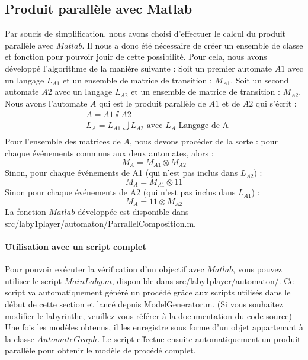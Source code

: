 \subsection{Produit parallèle avec Matlab}
\label{subsec:parallele}
Par soucis de simplification, nous avons choisi d'effectuer le calcul du produit parallèle avec $Matlab$. Il nous a donc été nécessaire de créer un ensemble de classe et fonction pour pouvoir jouir de cette possibilité. Pour cela, nous avons développé l'algorithme de la manière suivante :
Soit un premier automate $ A1$  avec un langage $L_{A1}$  et un ensemble de matrice de transition : $M_{A1}$.
Soit un second automate $A2$  avec un langage $L_{A2}$  et un ensemble de matrice de transition : $M_{A2}$.\\
Nous avons l'automate $A$ qui est le produit parallèle de $A1$ et de $A2$  qui s'écrit :
\begin{align*}
& A = A1 \sslash A2\\
&L_A = L_{A1} \bigcup L_{A2} \text{ avec } L_A\text{ Langage de A}\\
\end{align*}
Pour l'ensemble des matrices de $A$, nous devons procéder de la sorte : pour chaque événements communs aux deux automates, alors :
\begin{equation}
M_{A} = M_{A1} \otimes M_{A2}
\end{equation}
Sinon, pour chaque événements de A1 (qui n'est pas inclus dans $L_{A2}$) :
\begin{equation}
M_{A} = M_{A1} \otimes 1\!\!1 
\end{equation}
Sinon pour chaque événements de A2 (qui n'est pas inclus dans $L_{A1}$) :
\begin{equation}
M_{A} = 1\!\!1 \otimes M_{A2}
\end{equation}
La fonction $Matlab$ développée est disponible dans src/laby1player/automaton/ParrallelComposition.m. 


\paragraph*{Utilisation avec un script complet}
Pour pouvoir exécuter la vérification d'un objectif avec $Matlab$, vous pouvez utiliser le script $MainLaby.m$, disponible dans src/laby1player/automaton/. Ce script va automatiquement généré un procédé grâce aux scripts utilisés dans le début de cette section et lancé depuis ModelGenerator.m. (Si vous souhaitez modifier le labyrinthe, veuillez-vous référer à la documentation du code source) Une fois les modèles obtenus, il les enregistre sous forme d'un objet appartenant à la classe $AutomateGraph$. Le script effectue ensuite automatiquement un produit parallèle pour obtenir le modèle de procédé complet. 

